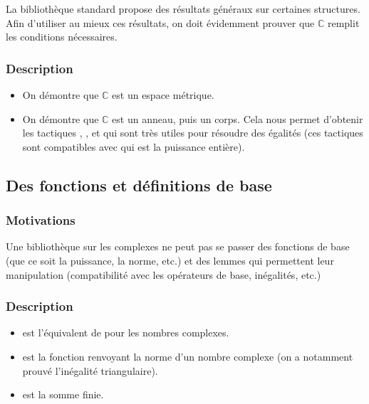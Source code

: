 La bibliothèque standard propose des résultats généraux sur certaines structures. Afin d'utiliser au mieux ces résultats, on doit évidemment prouver que $\mathbb{C}$ remplit les conditions nécessaires.

\subsubsection{Description}

\begin{itemize}
 \item {} On démontre que $\mathbb{C}$ est un espace métrique.
 \item {} On démontre que $\mathbb{C}$ est un anneau, puis un corps. Cela nous permet d'obtenir les tactiques , ,  et  qui sont très utiles pour résoudre des égalités (ces tactiques sont compatibles avec  qui est la puissance entière).
\end{itemize}


\subsection{Des fonctions et définitions de base}

\subsubsection{Motivations}

Une bibliothèque sur les complexes ne peut pas se passer des fonctions de base (que ce soit la puissance, la norme, etc.) et des lemmes qui permettent leur manipulation (compatibilité avec les opérateurs de base, inégalités, etc.)

\subsubsection{Description}

\begin{itemize}
 \item {} est l'équivalent de  pour les nombres complexes.
 \item {} est la fonction renvoyant la norme d'un nombre complexe (on a notamment prouvé l'inégalité triangulaire).
 \item {} est la somme finie.
\end{itemize}



